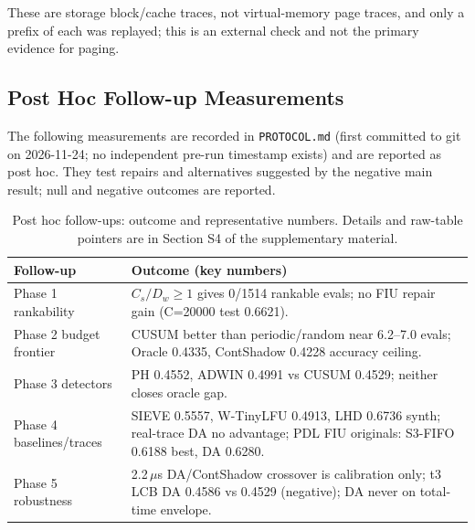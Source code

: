 \documentclass[10pt,twocolumn,a4paper]{IEEEtran}
\begin{document}
These are storage block/cache traces, not virtual-memory page traces, and only
a prefix of each was replayed; this is an external check and not the primary
evidence for paging.

\subsection{Post Hoc Follow-up Measurements}
\label{sec:posthoc_followups}

The following measurements are recorded in \texttt{PROTOCOL.md}
(first committed to git on 2026-11-24; no independent pre-run timestamp
exists) and are reported as post hoc. They test repairs and
alternatives suggested by the negative main result; null and negative
outcomes are reported.

\begin{table}[!t]
\caption{Post hoc follow-ups: outcome and representative numbers. Details
and raw-table pointers are in Section S4 of the supplementary material.}
\label{tab:prespec}
\footnotesize
\setlength{\tabcolsep}{3pt}
\begin{tabular}{@{}p{}p{}@{}}
\toprule
Follow-up & Outcome (key numbers) \\
\midrule
Phase 1 rankability & $C_s/D_w\ge1$ gives 0/1514 rankable evals; no FIU repair gain (C=20000 test 0.6621). \\
Phase 2 budget frontier & CUSUM better than periodic/random near 6.2--7.0 evals; Oracle 0.4335, ContShadow 0.4228 accuracy ceiling. \\
Phase 3 detectors & PH 0.4552, ADWIN 0.4991 vs CUSUM 0.4529; neither closes oracle gap. \\
Phase 4 baselines/traces & SIEVE 0.5557, W-TinyLFU 0.4913, LHD 0.6736 synth; real-trace DA no advantage; PDL FIU originals: S3-FIFO 0.6188 best, DA 0.6280. \\
Phase 5 robustness & 2.2\,$\mu$s DA/ContShadow crossover is calibration only; t3 LCB DA 0.4586 vs 0.4529 (negative); DA never on total-time envelope. \\
\bottomrule
\end{tabular}
\end{table}
\end{document}

